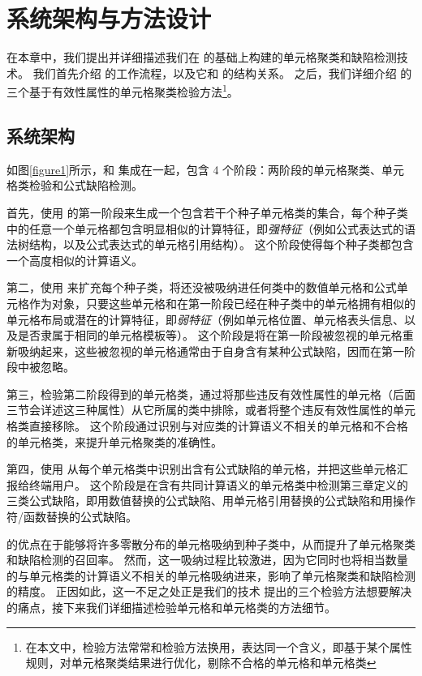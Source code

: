 \chapter{系统架构与方法设计}
在本章中，我们提出并详细描述我们在 \cu 的基础上构建的单元格聚类和缺陷检测技术\wa 。
我们首先介绍 \wa 的工作流程，以及它和 \cu 的结构关系。
之后，我们详细介绍 \wa 的三个基于有效性属性的单元格聚类检验方法\footnote{在本文中，检验方法常常和检验方法换用，表达同一个含义，即基于某个属性规则，对单元格聚类结果进行优化，剔除不合格的单元格和单元格类}。


\section{系统架构}
如图\ref{figure1}所示，\wa 和 \cu 集成在一起，包含 4 个阶段：两阶段的单元格聚类、单元格类检验和公式缺陷检测。

首先，\wa 使用 \cu 的第一阶段来生成一个包含若干个种子单元格类的集合，每个种子类中的任意一个单元格都包含明显相似的计算特征，即\textit{强特征}（例如公式表达式的语法树结构，以及公式表达式的单元格引用结构）。
这个阶段使得每个种子类都包含一个高度相似的计算语义。

第二，\wa 使用 \cu 来扩充每个种子类，将还没被吸纳进任何类中的数值单元格和公式单元格作为对象，只要这些单元格和在第一阶段已经在种子类中的单元格拥有相似的单元格布局或潜在的计算特征，即\textit{弱特征}（例如单元格位置、单元格表头信息、以及是否隶属于相同的单元格模板等）。
这个阶段是将在第一阶段被忽视的单元格重新吸纳起来，这些被忽视的单元格通常由于自身含有某种公式缺陷，因而在第一阶段中被忽略。

第三，\wa 检验第二阶段得到的单元格类，通过将那些违反有效性属性的单元格（后面三节会详述这三种属性）从它所属的类中排除，或者将整个违反有效性属性的单元格类直接移除。
这个阶段通过识别与对应类的计算语义不相关的单元格和不合格的单元格类，来提升单元格聚类的准确性。

第四，\wa 使用 \cu 从每个单元格类中识别出含有公式缺陷的单元格，并把这些单元格汇报给终端用户。
这个阶段是在含有共同计算语义的单元格类中检测第三章定义的三类公式缺陷，即用数值替换的公式缺陷、用单元格引用替换的公式缺陷和用操作符/函数替换的公式缺陷。

\cu 的优点在于能够将许多零散分布的单元格吸纳到种子类中，从而提升了单元格聚类和缺陷检测的召回率\cite{cheung2016custodes}。
然而，这一吸纳过程比较激进，因为它同时也将相当数量的与单元格类的计算语义不相关的单元格吸纳进来，影响了单元格聚类和缺陷检测的精度。
正因如此，这一不足之处正是我们的技术 \wa 提出的三个检验方法想要解决的痛点，接下来我们详细描述检验单元格和单元格类的方法细节。



